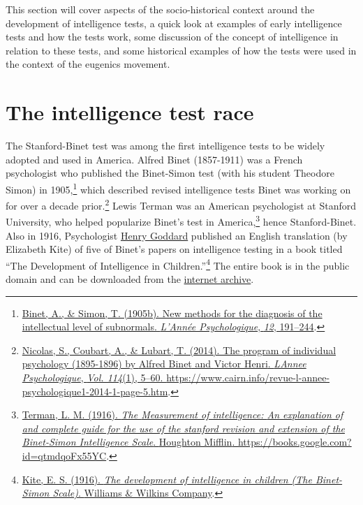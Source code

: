 \documentclass[
  oneside,
  12pt]{crumpbook}
\begin{document}
This section will cover aspects of the socio-historical context around the development of intelligence tests, a quick look at examples of early intelligence tests and how the tests work, some discussion of the concept of intelligence in relation to these tests, and some historical examples of how the tests were used in the context of the eugenics movement.

\hypertarget{the-intelligence-test-race}{%
\section{The intelligence test race}\label{the-intelligence-test-race}}

The Stanford-Binet test was among the first intelligence tests to be widely adopted and used in America. Alfred Binet (1857-1911) was a French psychologist who published the Binet-Simon test (with his student Theodore Simon) in 1905,\footnote{\protect\hyperlink{ref-binetNewMethodsDiagnosis1905}{Binet, A., \& Simon, T. (1905b). New methods for the diagnosis of the intellectual level of subnormals. \emph{L'Année Psychologique}, \emph{12}, 191--244}.} which described revised intelligence tests Binet was working on for over a decade prior.\footnote{\protect\hyperlink{ref-nicolasProgramIndividualPsychology2014}{Nicolas, S., Coubart, A., \& Lubart, T. (2014). The program of individual psychology (1895-1896) by {Alfred Binet} and {Victor Henri}. \emph{LAnnee Psychologique}, \emph{Vol. 114}(1), 5--60. \url{https://www.cairn.info/revue-l-annee-psychologique1-2014-1-page-5.htm}}.} Lewis Terman was an American psychologist at Stanford University, who helped popularize Binet's test in America,\footnote{\protect\hyperlink{ref-termanMeasurementIntelligenceExplanation1916}{Terman, L. M. (1916). \emph{The {Measurement} of intelligence: {An} explanation of and complete guide for the use of the stanford revision and extension of the {Binet}-{Simon Intelligence Scale}}. {Houghton Mifflin}. \url{https://books.google.com?id=qtmdqoFx55YC}}.} hence Stanford-Binet. Also in 1916, Psychologist \href{https://en.wikipedia.org/wiki/Henry_H._Goddard}{Henry Goddard} published an English translation (by Elizabeth Kite) of five of Binet's papers on intelligence testing in a book titled ``The Development of Intelligence in Children.''\footnote{\protect\hyperlink{ref-kiteDevelopmentIntelligenceChildren1916}{Kite, E. S. (1916). \emph{The development of intelligence in children ({The Binet}-{Simon Scale})}. {Williams \& Wilkins Company}}.} The entire book is in the public domain and can be downloaded from the \href{https://archive.org}{internet archive}.
\end{document}
